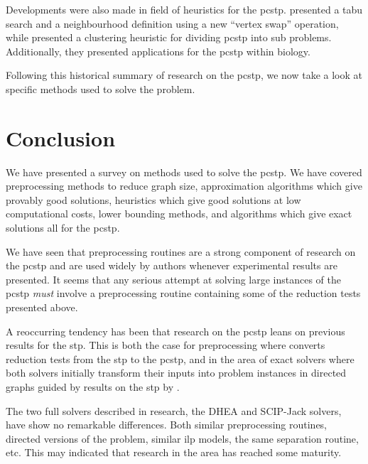   Developments were also made in field of heuristics for the \gls{pcstp}. \citet{fu2014knowledge} presented a tabu search and a neighbourhood definition
  using a new ``vertex swap'' operation, while
  \citet{akhmedov2016divide} presented a clustering heuristic
  for dividing \gls{pcstp} into sub problems.
  Additionally, they presented
  applications for the \gls{pcstp} within biology.

  \bigskip
  Following this historical summary of research on the \gls{pcstp}, we now take a look at specific methods used to solve the problem.

\clearpage


\clearpage








\section{Conclusion}
We have presented a survey on methods used to solve the \acrlong{pcstp}. We have covered
preprocessing methods to reduce graph size, approximation algorithms which give provably
good solutions, heuristics which give good solutions at low computational costs, lower
bounding methods, and algorithms which give exact solutions all for the \gls{pcstp}.

We have seen that preprocessing routines are a strong component of
research on the \gls{pcstp} and are
used widely by authors whenever experimental results are presented. It seems that
any serious attempt at solving large instances of the \gls{pcstp} \textit{must} involve a
preprocessing routine containing some of the reduction tests presented above.

A reoccurring tendency has been that research on the \gls{pcstp} leans on
previous results for the \gls{stp}. This is both the case for preprocessing
where \citet{uchoa2006reduction} converts reduction tests from the \gls{stp}
to the \gls{pcstp}, and in the area of exact solvers where both solvers
initially transform their inputs into problem instances in directed graphs
guided by results on the \gls{stp} by \citet{chopra1994steiner}.

The two full solvers described in research, the DHEA and SCIP-Jack solvers, have show no
remarkable differences. Both similar preprocessing routines, directed versions of the problem,
similar \gls{ilp} models, the same separation routine, etc. This may indicated that research
in the area has reached some maturity.




